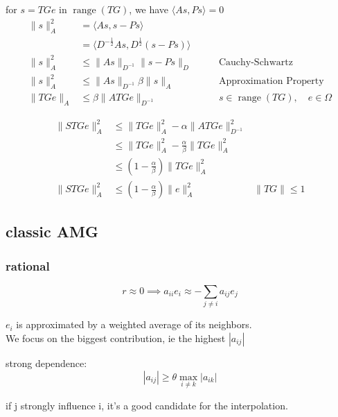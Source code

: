 \documentclass{article}
\DeclareMathOperator{\range}{range}
\begin{document}
for $s = TGe $ in $\range(TG)$, we have $\langle As,Ps\rangle = 0$
\begin{align*}
    \|s\|_A^2 & = \langle As,s - Ps\rangle \\
              & = \langle D^{-\frac{1}{2}}As,D^{\frac{1}{2}}(s - Ps)\rangle \\
    \|s\|_A^2 & \le \|As\|_{D^{-1}}\|s - Ps\|_D \qquad & \text{Cauchy-Schwartz} \\
    \|s\|_A^2 & \le \|As\|_{D^{-1}}\beta\|s\|_A & \text{Approximation Property} \\
    \|TGe\|_A & \le \beta \|ATGe\|_{D^{-1}} & s \in \range(TG), \quad e \in \Omega
\end{align*}

\begin{align*}
    \|S TGe\|_{A}^2 & \le \|TGe\|_{A}^2 - \alpha \|A TGe\|_{D^{-1}}^2 \\
                    & \le \|TGe\|_{A}^2 - \frac{\alpha}{\beta}\|TGe\|_{A}^2 \\ 
                    & \le (1 - \frac{\alpha}{\beta})\|TGe\|_{A}^2 \\
    \|S TGe\|_{A}^2 & \le (1 - \frac{\alpha}{\beta})\|e\|_{A}^2 \qquad & \|TG\| \le 1
\end{align*}



\subsection{classic AMG}

\subsubsection*{rational}
\[
    r \approx 0 \implies a_{ii}e_i \approx - \sum_{j \neq i}{a_{ij}e_j}
\]

$e_{i}$ is approximated by a weighted average of its neighbors. \\ 
We focus on the biggest contribution, ie the highest $|a_{ij}|$

strong dependence:
\[
|a_{ij}| \ge \theta \max_{i \ne k}{|a_{ik}|}
\]

if j strongly influence i, it's a good candidate for the interpolation.
\end{document}
